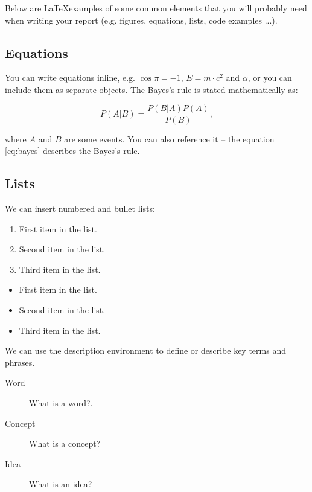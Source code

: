 \documentclass[fleqn,moreauthors,10pt]{ds_report}
\begin{document}
Below are \LaTeX examples of some common elements that you will probably need when writing your report (e.g. figures, equations, lists, code examples ...).


\subsection*{Equations}

You can write equations inline, e.g. $\cos\pi=-1$, $E = m \cdot c^2$ and $\alpha$, or you can include them as separate objects. The Bayes’s rule is stated mathematically as:

\begin{equation}
	P(A|B) = \frac{P(B|A)P(A)}{P(B)},
	\label{eq:bayes}
\end{equation}

where $A$ and $B$ are some events. You can also reference it -- the equation \ref{eq:bayes} describes the Bayes's rule.

\subsection*{Lists}

We can insert numbered and bullet lists:

\begin{enumerate}[noitemsep] 
	\item First item in the list.
	\item Second item in the list.
	\item Third item in the list.
\end{enumerate}

\begin{itemize}[noitemsep] 
	\item First item in the list.
	\item Second item in the list.
	\item Third item in the list.
\end{itemize}

We can use the description environment to define or describe key terms and phrases.

\begin{description}
	\item[Word] What is a word?.
	\item[Concept] What is a concept?
	\item[Idea] What is an idea?
\end{description}
\end{document}
